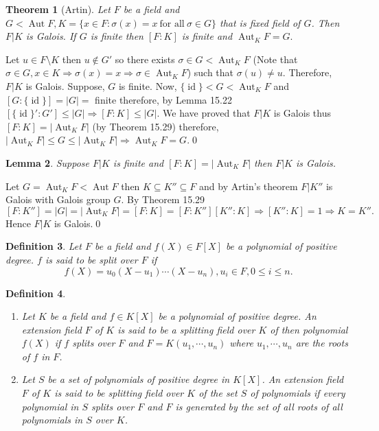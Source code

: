 \documentclass[11pt]{amsart}
\newtheorem{theorem}{Theorem}[section]
\newtheorem{defn}[theorem]{Definition}
\newtheorem{lemma}[theorem]{Lemma}%
\DeclareMathOperator{\aut}{\text{Aut}}
\DeclareMathOperator{\id}{\text{id}}
\begin{document}
\begin{theorem}[Artin]
Let $F$ be a field and $G<\aut F, K=\{x\in F:\sigma(x)=x~\text{for all}~\sigma\in G\}$ that is fixed field of $G$. Then $F|K$ is Galois. If $G$ is finite then $[F:K]$ is finite and $\aut_KF=G.$
\end{theorem}
\proof Let $u\in F\setminus K$ then $u\notin G'$ so there exists $\sigma\in G<\aut_KF$ (Note that $\sigma\in G,x\in K \Rightarrow \sigma(x)=x\Rightarrow \sigma\in\aut_KF$) such that $\sigma(u)\neq u.$ Therefore, $F|K$ is Galois. Suppose, $G$ is finite. Now, $\{\id\}<G<\aut_KF$ and $[G:\{\id\}]=|G|=$ finite therefore, by Lemma 15.22 $[\{\id\}':G']\leq |G| \Rightarrow [F:K]\leq |G|.$ We have proved that $F|K$ is Galois thus $[F:K]=|\aut_KF|$ (by Theorem 15.29) therefore, $|\aut_KF|\leq G\leq |\aut_KF|\Rightarrow \aut_KF=G.$\qed

\begin{lemma}
Suppose $F|K$ is finite and $[F:K]=|\aut_KF|$ then $F|K$ is Galois.
\end{lemma}
\proof Let $G=\aut_KF<\aut F$ then $K\subseteq K''\subseteq F$ and by Artin's theorem $F|K''$ is Galois with Galois group $G$. By Theorem 15.29 $[F:K'']=|G|=|\aut_KF|=[F:K]=[F:K''][K'':K] \Rightarrow [K'':K]=1 \Rightarrow K=K''.$ Hence $F|K$ is Galois.\qed 

\begin{defn}
Let $F$ be a field and $f(X)\in F[X]$ be a polynomial of positive degree. $f$ is said to be split over $F$ if $$f(X)=u_0(X-u_1)\cdots (X-u_n),u_i\in F,0\leq i\leq n.$$
\end{defn}

\begin{defn}
\begin{enumerate}
\item 
Let $K$ be a field and $f\in K[X]$ be a polynomial of positive degree. An extension field $F$ of $K$ is said to be a splitting field over $K$ of then polynomial $f(X)$ if $f$ splits over $F$ and $F=K(u_1,\cdots,u_n)$ where $u_1,\cdots,u_n$ are the roots of $f$ in $F$.
\item Let $S$ be a set of polynomials of positive degree in $K[X]$. An extension field $F$ of $K$ is said to be splitting field over $K$ of the set $S$ of polynomials if every polynomial in $S$ splits over $F$ and $F$ is generated by the set of all roots of all polynomials in $S$ over $K$.
\end{enumerate}
\end{defn}
\end{document}
